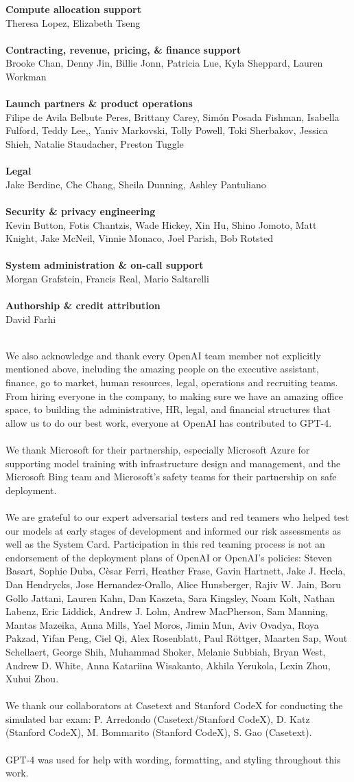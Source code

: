 \documentclass{article}
\newcommand{\creditlistheader}[1]{\textbf{#1}\footnotemark[\thefootnote]\\}
\newcommand{\creditlist}[2]{\creditlistheader{#1}#2\\
\\}
\begin{document}
\begin{multicols}{2}
\creditlist{Compute allocation support}{Theresa Lopez, Elizabeth Tseng}
\creditlist{Contracting, revenue, pricing, \& finance support}{Brooke Chan, Denny Jin, Billie Jonn, Patricia Lue, Kyla Sheppard, Lauren Workman}
\creditlist{Launch partners \& product operations}{Filipe de Avila Belbute Peres, Brittany Carey, Sim\'on Posada Fishman, Isabella Fulford, Teddy Lee,, Yaniv Markovski, Tolly Powell, Toki Sherbakov, Jessica Shieh, Natalie Staudacher, Preston Tuggle}
\creditlist{Legal}{Jake Berdine, Che Chang, Sheila Dunning, Ashley Pantuliano}
\creditlist{Security \& privacy engineering}{Kevin Button, Fotis Chantzis, Wade Hickey, Xin Hu, Shino Jomoto, Matt Knight, Jake McNeil, Vinnie Monaco, Joel Parish, Bob Rotsted}
\creditlist{System administration \& on-call support}{Morgan Grafstein, Francis Real, Mario Saltarelli}
\creditlist{Authorship \& credit attribution}{David Farhi}

\end{multicols}

We also acknowledge and thank every OpenAI team member not explicitly mentioned above, including the amazing people on the executive assistant, finance, go to market, human resources, legal, operations and recruiting teams. From hiring everyone in the company, to making sure we have an amazing office space, to building the administrative, HR, legal, and financial structures that allow us to do our best work, everyone at OpenAI has contributed to GPT-4.
\\
\\
We thank Microsoft for their partnership, especially Microsoft Azure for supporting model training with infrastructure design and management, and the Microsoft Bing team and Microsoft's safety teams for their partnership on safe deployment.
\\
\\
We are grateful to our expert adversarial testers and red teamers who helped test our models at early stages of development and informed our risk assessments as well as the System Card. Participation in this red teaming process is not an endorsement of the deployment plans of OpenAI or OpenAI's policies: Steven Basart, Sophie Duba, C\`esar Ferri, Heather Frase, Gavin Hartnett, Jake J. Hecla, Dan Hendrycks, Jose Hernandez-Orallo, Alice Hunsberger, Rajiv W. Jain, Boru Gollo Jattani, Lauren Kahn, Dan Kaszeta, Sara Kingsley, Noam Kolt, Nathan Labenz, Eric Liddick, Andrew J. Lohn, Andrew MacPherson, Sam Manning, Mantas Mazeika, Anna Mills, Yael Moros, Jimin Mun, Aviv Ovadya, Roya Pakzad, Yifan Peng, Ciel Qi, Alex Rosenblatt, Paul R\"ottger, Maarten Sap, Wout Schellaert, George Shih, Muhammad Shoker, Melanie Subbiah, Bryan West, Andrew D. White, Anna Katariina Wisakanto, Akhila Yerukola, Lexin Zhou, Xuhui Zhou.
\\
\\
We thank our collaborators at Casetext and Stanford CodeX for conducting the simulated bar exam: P. Arredondo (Casetext/Stanford CodeX), D. Katz (Stanford CodeX), M. Bommarito (Stanford CodeX), S. Gao (Casetext).
\\
\\
GPT-4 was used for help with wording, formatting, and styling throughout this work.
\end{document}
